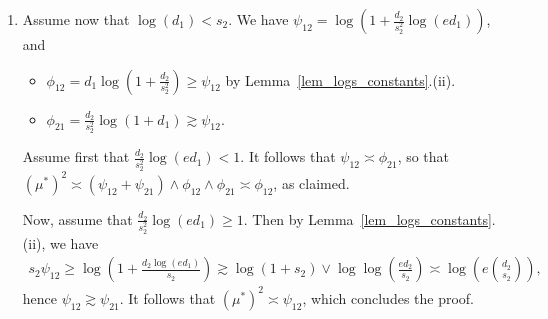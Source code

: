 \documentclass{article}
\theoremstyle{remark}
\begin{document}
\begin{enumerate}
\item Assume now that $\log(d_1)< s_2$. We have $\psi_{12} = \log\left(1+\frac{d_2}{s_2^2}\log(ed_1)\right)$, and 
\begin{itemize}
    \item $\phi_{12} = d_1 \log\left(1+\frac{d_2}{s_2^2}\right) \geq \psi_{12}$ by Lemma~\ref{lem_logs_constants}.(ii).
    \item $\phi_{21} = \frac{d_2}{s_2^2}\log (1+d_1) \gtrsim \psi_{12}$.
\end{itemize}
Assume first that $\frac{d_2}{s_2^2}\log (ed_1)<1$. It follows that $\psi_{12} \asymp \phi_{21}$, so that $(\mu^*)^2 \asymp(\psi_{12} + \psi_{21}) \land \phi_{12} \land \phi_{21} \asymp \phi_{12}$, as claimed. 

Now, assume that $\frac{d_2}{s_2^2}\log (ed_1) \geq 1$. Then by Lemma~\ref{lem_logs_constants}.(ii), we have
\begin{align*}
    s_2 \psi_{12} \geq \log\left(1+ \frac{d_2\log(ed_1)}{s_2}\right) \gtrsim \log(1+s_2) \lor \log\log\left(\frac{ed_2}{s_2}\right) \asymp \log\left(e{d_2 \choose s_2}\right),
\end{align*}
hence $\psi_{12} \gtrsim \psi_{21}$. It follows that $(\mu^*)^2 \asymp \psi_{12}$, which concludes the proof. 
\end{enumerate}
\end{document}
